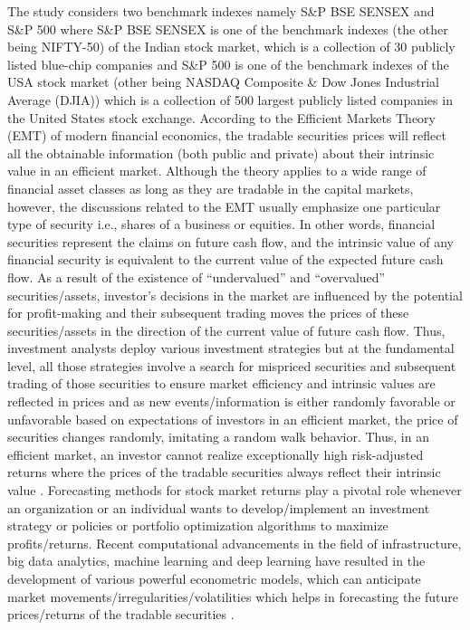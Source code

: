 \documentclass[conference]{IEEEtran}
\begin{document}
The study considers two benchmark indexes namely S\&P BSE SENSEX and S\&P 500 where S\&P BSE SENSEX is one of the benchmark indexes (the other being NIFTY-50) of the Indian stock market, which is a collection of 30 publicly listed blue-chip companies and S\&P 500 is one of the benchmark indexes of the USA stock market (other being NASDAQ Composite \& Dow Jones Industrial Average (DJIA)) which is a collection of 500 largest publicly listed companies in the United States stock exchange.
According to the Efficient Markets Theory (EMT) of modern financial economics, the tradable securities prices will reflect all the obtainable information (both public and private) about their intrinsic value in an efficient market. Although the theory applies to a wide range of financial asset classes as long as they are tradable in the capital markets, however, the discussions related to the EMT usually emphasize one particular type of security i.e., shares of a business or equities. In other words, financial securities represent the claims on future cash flow, and the intrinsic value of any financial security is equivalent to the current value of the expected future cash flow.
As a result of the existence of “undervalued” and “overvalued” securities/assets, investor's decisions in the market are influenced by the potential for profit-making and their subsequent trading moves the prices of these securities/assets in the direction of the current value of future cash flow. Thus, investment analysts deploy various investment strategies but at the fundamental level, all those strategies involve a search for mispriced securities and subsequent trading of those securities to ensure market efficiency and intrinsic values are reflected in prices and as new events/information is either randomly favorable or unfavorable based on expectations of investors in an efficient market, the price of securities changes randomly, imitating a random walk behavior. Thus, in an efficient market, an investor cannot realize exceptionally high risk-adjusted returns where the prices of the tradable securities always reflect their intrinsic value \cite{b1}.
Forecasting methods for stock market returns play a pivotal role whenever an organization or an individual wants to develop/implement an investment strategy or policies or portfolio optimization algorithms to maximize profits/returns. Recent computational advancements in the field of infrastructure, big data analytics, machine learning and deep learning \cite{b13} \cite{b14} have resulted in the development of various powerful econometric models, which can anticipate market movements/irregularities/volatilities which helps in forecasting the future prices/returns of the tradable securities \cite{b2} \cite{b8} \cite{b9} \cite{b10} \cite{b11} \cite{b12}.
\end{document}
